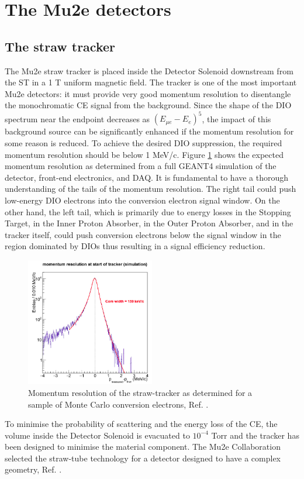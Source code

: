 \section{The Mu2e detectors}
\subsection{The straw tracker}\label{trackersec}
The Mu2e straw tracker is placed inside the Detector Solenoid downstream from 
the ST in a 1 T uniform magnetic field. The tracker is one of the most 
important Mu2e detectors: it must provide very good momentum resolution to 
disentangle the monochromatic CE signal from the background. 
Since the shape of the DIO spectrum near the endpoint decreases as 
$(E_{\mu e} -E_e)^5$, the impact of this background source can be significantly 
enhanced if the momentum resolution for some reason is reduced. 
To achieve the desired DIO suppression, the required momentum resolution should be below 1 MeV/c.  
Figure \ref{fig:trkres} shows the expected momentum resolution as determined 
from a full GEANT4 simulation of the detector, front-end electronics, and DAQ.
It is fundamental to have a thorough understanding of the tails of the momentum resolution. 
The right tail could push low-energy DIO electrons into the conversion electron signal window. 
On the other hand, the left tail, which is primarily due to energy losses in the Stopping Target, 
in the Inner Proton Absorber, in the Outer Proton Absorber, and in the tracker itself, could 
push conversion electrons below the signal window in the region dominated by DIOs 
thus resulting in a signal efficiency reduction.
\begin{figure}[!h]
    \centering
    \includegraphics[width =0.5\textwidth]{figures/png/Screenshot_20240330_104830.png}
    \caption{Momentum resolution of the straw-tracker as determined for 
    a sample of Monte Carlo conversion electrons, Ref. \cite{bobbb}.}
    \label{fig:trkres}
    \end{figure} 
To minimise the probability of scattering and the energy loss of the CE, 
the volume inside the Detector Solenoid is evacuated to $10^{-4}$ Torr 
and the tracker has been designed to minimise the material component. 
The Mu2e Collaboration selected the straw-tube technology for a detector 
designed to have a complex geometry, Ref. \cite{bobbb}.

